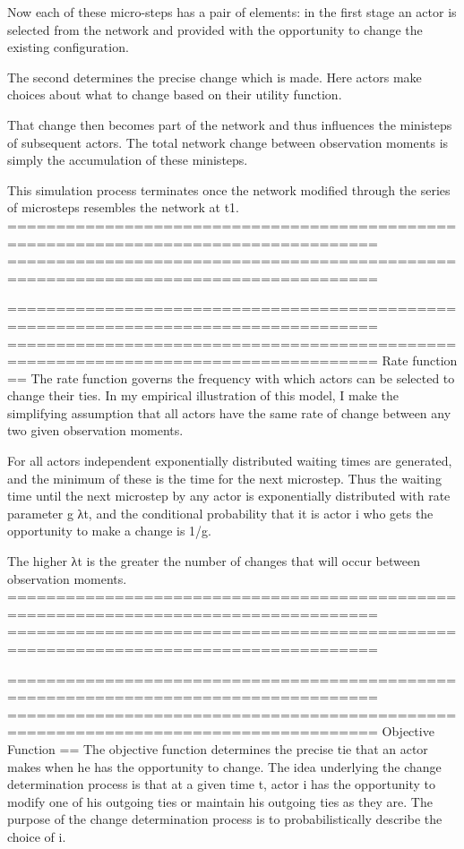 Now each of these micro-steps has a pair of elements: in the first stage an actor is selected from the network and provided with the opportunity to change the existing configuration. 

The second determines the precise change which is made. Here actors make choices about what to change based on their utility function. 

That change then becomes part of the network and thus influences the ministeps of subsequent actors. The total network change between observation moments is simply the accumulation of these ministeps. 

This simulation process terminates once the network modified through the series of microsteps resembles the network at t1.
====================================================================================
====================================================================================

====================================================================================
====================================================================================
Rate function
==
The rate function governs the frequency with which actors can be selected to change their ties. In my empirical illustration of this model, I make the simplifying assumption that all actors have the same rate of change between any two given observation moments. 

For all actors independent exponentially distributed waiting times are generated, and the minimum of these is the time for the next microstep. Thus the waiting time until the next microstep by any actor is exponentially distributed with rate parameter g λt, and the conditional probability that it is actor i who gets the opportunity to make a change is 1/g. 

The higher λt is the greater the number of changes that will occur between observation moments. 
====================================================================================
====================================================================================

====================================================================================
====================================================================================
Objective Function
==
The objective function determines the precise tie that an actor makes when he has the opportunity to change. The idea underlying the change determination process is that at a given time t, actor i has the opportunity to modify one of his outgoing ties or maintain his outgoing ties as they are. The purpose of the change determination process is to probabilistically describe the choice of i.

